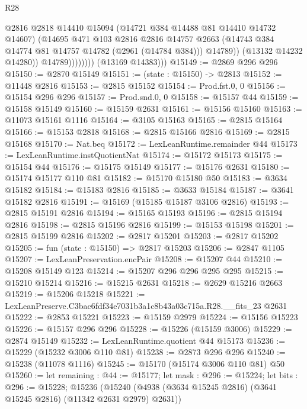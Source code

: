 \begin{lexlean}{R28}
\begin{coremodule}
                            @2816
                            @2818
                            @14410
                            @15094
                            (@14721 @384 @14488 @81 @14410 @14732 @14607)
                            (@14695
                              @471
                              @103
                              @2816
                              @2816
                              @14757
                              @2663
                              (@14743 @384 @14774 @81 @14757 @14782 (@2961 (@14784 @384)))
                              @14789))
                          (@13132 @14232 @14280))
                        @14789))))))))
        (@13169 @14383)))
@15149 := @2869 @296 @296
@15150 := @2870 @15149
@15151 := (state : @15150) -> @2813
@15152 := @11448 @2816
@15153 := @2815 @15152
@15154 := Prod.fst.{0, 0}
@15156 := @15154 @296 @296
@15157 := Prod.snd.{0, 0}
@15158 := @15157 @44
@15159 := @15158 @15149
@15160 := @15159 @2631
@15161 := @15156 @15160
@15163 := @11073 @15161 @1116
@15164 := @3105 @15163
@15165 := @2815 @15164
@15166 := @15153 @2818
@15168 := @2815 @15166 @2816
@15169 := @2815 @15168
@15170 := Nat.beq
@15172 := LexLeanRuntime.remainder @44
@15173 := LexLeanRuntime.instQuotientNat
@15174 := @15172 @15173
@15175 := @15154 @44
@15176 := @15175 @15149
@15177 := @15176 @2631
@15180 := @15174 @15177 @110 @81
@15182 := @15170 @15180 @50
@15183 := @3634 @15182
@15184 := @15183 @2816
@15185 := @3633 @15184
@15187 := @3641 @15182 @2816
@15191 := @15169 (@15185 @15187 @3106 @2816)
@15193 := @2815 @15191 @2816
@15194 := @15165 @15193
@15196 := @2815 @15194 @2816
@15198 := @2815 @15196 @2816
@15199 := @15153 @15198
@15201 := @2815 @15199 @2816
@15202 := @2817 @15201
@15203 := @2817 @15202
@15205 := fun (state : @15150) => @2817 @15203
@15206 := @2847 @1105
@15207 := LexLeanPreservation.encPair
@15208 := @15207 @44
@15210 := @15208 @15149 @123
@15214 := @15207 @296 @296 @295 @295
@15215 := @15210 @15214
@15216 := @15215 @2631
@15218 := @2629 @15216 @2663
@15219 := @15206 @15218
@15221 := LexLeanPreserve.C3bac6fdf34e7031b3a1c8b43a03c715a.R28.__fits_23 @2631
@15222 := @2853 @15221
@15223 := @15159 @2979
@15224 := @15156 @15223
@15226 := @15157 @296 @296
@15228 := @15226 (@15159 @3006)
@15229 := @2874 @15149
@15232 := LexLeanRuntime.quotient @44 @15173
@15236 := @15229 (@15232 @3006 @110 @81)
@15238 := @2873 @296 @296
@15240 := @15238 (@11078 @1116)
@15245 := @15170 (@15174 @3006 @110 @81) @50
@15260 := let remaining : @44 := @15177;
  let mask : @296 := @15224;
  let bits : @296 := @15228;
  @15236 (@15240 (@4938 (@3634 @15245 @2816) (@3641 @15245 @2816) (@11342 @2631 @2979) @2631))

\end{coremodule}
\end{lexlean}
